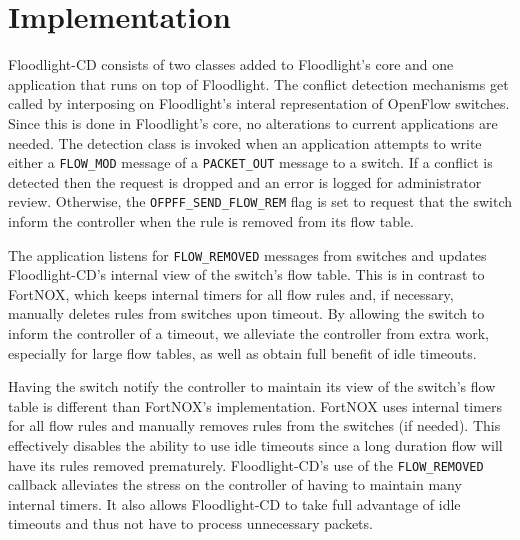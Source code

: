 \section{Implementation}
\label{sec:implementation}

Floodlight-CD consists of two classes added to Floodlight's core and one application that runs on top of Floodlight.
The conflict detection mechanisms get called by interposing on Floodlight's interal representation of OpenFlow switches.
Since this is done in Floodlight's core, no alterations to current applications are needed.
The detection class is invoked when an application attempts to write either a \texttt{FLOW\_MOD} message of a \texttt{PACKET\_OUT} message to a switch.
If a conflict is detected then the request is dropped and an error is logged for administrator review.
Otherwise, the \texttt{OFPFF\_SEND\_FLOW\_REM} flag is set to request that the switch inform the controller when the rule is removed from its flow table.

The application listens for \texttt{FLOW\_REMOVED} messages from switches and updates Floodlight-CD's internal view of the switch's flow table.
This is in contrast to FortNOX, which keeps internal timers for all flow rules and, if necessary, manually deletes rules from switches upon timeout.
By allowing the switch to inform the controller of a timeout, we alleviate the controller from extra work, especially for large flow tables, as well as obtain full benefit of idle timeouts.

Having the switch notify the controller to maintain its view of the switch's flow table is different than FortNOX's implementation.
FortNOX uses internal timers for all flow rules and manually removes rules from the switches (if needed).
This effectively disables the ability to use idle timeouts since a long duration flow will have its rules removed prematurely.
Floodlight-CD's use of the \texttt{FLOW\_REMOVED} callback alleviates the stress on the controller of having to maintain many internal timers.
It also allows Floodlight-CD to take full advantage of idle timeouts and thus not have to process unnecessary packets.

